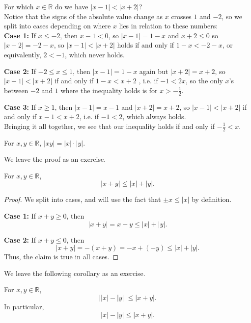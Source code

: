 \documentclass[11pt,dvipsnames]{book}
\numberwithin{figure}{section} %
\numberwithin{table}{section} %
\begin{document}
\begin{example}
For which $x\in\mathbb{R}$ do we have $|x-1|<|x+2|$?\\

Notice that the signs of the absolute value change as $x$ crosses $1$ and $-2$, so we split into cases depending on where $x$ lies in relation to these numbers:\\

{\bf Case 1:} If $x\leq -2$, then $x-1<0$, so $|x-1|=1-x$ and $x+2\leq 0$ so $|x+2|=-2-x$, so $|x-1|<|x+2|$ holds if and only if $1-x<-2-x$, or equivalently, $2<-1$, which never holds.

{\bf Case 2:} If $-2\leq x\leq 1$, then $|x-1|=1-x$ again but $|x+2|=x+2$, so $|x-1|<|x+2|$  if and only if $1-x<x+2$ , i.e. if $-1<2x$, so the only $x$'s between $-2$ and $1$ where the inequality holds is for $x>-\frac{1}{2}$.

{\bf Case 3:} If $x\geq 1$, then $|x-1|=x-1$ and $|x+2|=x+2$, so $|x-1|<|x+2|$ if and only if $x-1<x+2$, i.e. if $-1<2$, which always holds. \\

Bringing it all together, we see that our inequality holds if and only if $-\frac{1}{2}< x$.

\end{example}
\begin{lemma}
\label{l:|xy|=|x||y|}
For $x,y\in \mathbb{R}$, $|xy|=|x|\cdot |y|$.
\end{lemma}

We leave the proof as an exercise.

\begin{theorem}
For $x,y\in\mathbb{R}$,
\[
|x+y|\leq |x|+|y|.
\]
\end{theorem}

\begin{proof}
We split into cases, and will use the fact that $\pm x\leq |x|$ by definition.

{\bf Case 1:}  If $x+y\geq 0$, then
\[
|x+y|=x+y\leq |x|+|y|.
\]

{\bf Case 2:}  If $x+y\leq 0$, then
\[
|x+y|=-(x+y)=-x+(-y)\leq |x|+|y|.
\]
Thus, the claim is true in all cases.

\end{proof}

We leave the following corollary as an exercise.

\begin{corollary}
For $x,y\in\mathbb{R}$,
\[
\bigl||x|-|y|\bigr|\leq |x+y|.
\]
In particular,
\[
|x|-|y|\leq |x+y|.
\]

\end{corollary}
\end{document}
